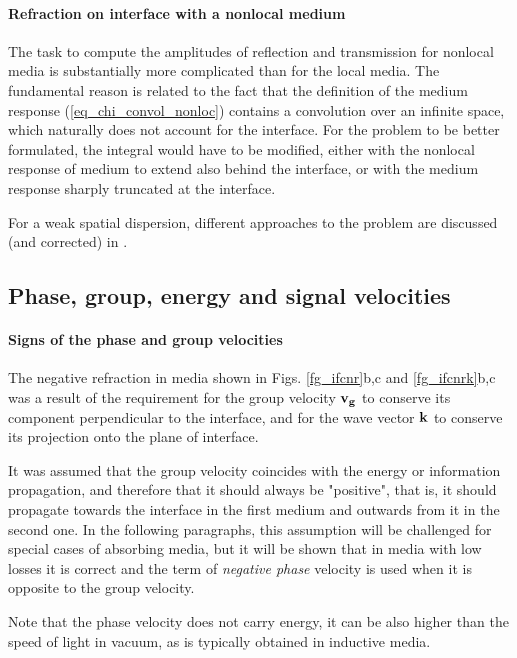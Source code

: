 \paragraph{Refraction on interface with a nonlocal medium}   %
The task to compute the amplitudes of reflection and transmission for nonlocal media is substantially more complicated than for the local media. The fundamental reason is related to the fact that the definition of the medium response (\ref{eq_chi_convol_nonloc}) contains a convolution over an infinite space, which naturally does not account for the interface. For the problem to be better formulated, the integral would have to be modified, either with the nonlocal response of medium to extend also behind the interface, or with the medium response sharply truncated at the interface.

For a weak spatial dispersion, different approaches to the problem are discussed (and corrected) in \cite{golubkov1995boundary}. %


\subsection{Phase, group, energy and signal velocities}
\label{chap_vfvg}
\paragraph{Signs of the phase and group velocities}%
The negative refraction in media shown in Figs. \ref{fg_ifcnr}b,c and \ref{fg_ifcnrk}b,c was a result of the requirement for the group velocity ${\mathbf{v_g}}$ to conserve its component perpendicular to the interface, and for the wave vector ${\mathbf{k}}$ to conserve its projection onto the plane of interface. 

It was assumed that the group velocity coincides with the energy or information propagation, and therefore that it should always be "positive", that is, it should propagate towards the interface in the first medium and outwards from it in the second one. In the following paragraphs, this assumption will be challenged for special cases of absorbing media, but it will be shown that in media with low losses it is correct and the term of \textit{negative phase} velocity is used when it is opposite to the group velocity.

Note that the phase velocity does not carry energy, it can be also higher than the speed of light in vacuum, as is typically obtained in inductive media.

